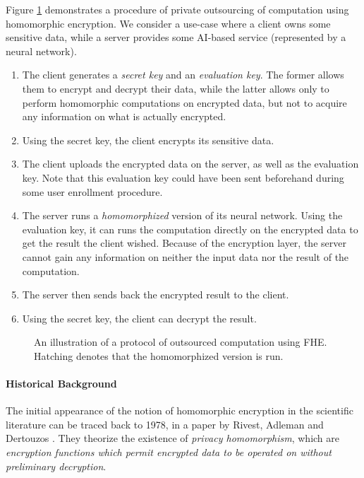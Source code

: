 Figure \ref{fig:classical_usage_fhe} demonstrates a procedure of private outsourcing of computation using homomorphic encryption. We consider a use-case where a client owns some sensitive data, while a server provides some AI-based service (represented by a neural network).

\begin{enumerate}
	\item The client generates a \textit{secret key} and an \textit{evaluation key}. The former allows them to encrypt and decrypt their data, while the latter allows only to perform homomorphic computations on encrypted data, but not to acquire any information on what is actually encrypted.
	\item Using the secret key, the client encrypts its sensitive data.
	\item The client uploads the encrypted data on the server, as well as the evaluation key. Note that this evaluation key could have been sent beforehand during some user enrollment procedure.
	\item The server runs a \textit{homomorphized} version of its neural network. Using the evaluation key, it can runs the computation directly on the encrypted data to get the result the client wished. Because of the encryption layer, the server cannot gain any information on neither the input data nor the result of the computation.
	\item The server then sends back the encrypted result to the client.
	\item Using the secret key, the client can decrypt the result.
\end{enumerate}


\begin{figure}
	\centering
	
	\caption{An illustration of a protocol of outsourced computation using FHE. Hatching denotes that the homomorphized version is run.}
	\label{fig:classical_usage_fhe}
\end{figure}


\paragraph{Historical Background}

The initial appearance of the notion of homomorphic encryption in the scientific literature can be traced back to 1978, in a paper by Rivest, Adleman and Dertouzos \cite{RAD78}. They theorize the existence of \textit{privacy homomorphism}, which are \textit{encryption functions which permit encrypted data to be operated on without preliminary decryption}.

